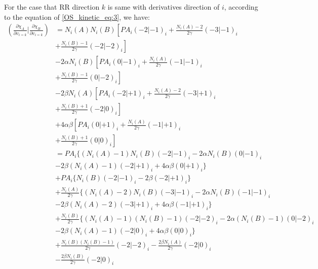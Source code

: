 For the case that RR direction $k$ is same with derivatives direction of $i$, according
to the equation of \ref{OS_kinetic_eq:3}, we have:
\begin{equation}
 \begin{split}
 \left(  \frac{\partial \chi_{A}}{\partial v_{i=k}}|
 \frac{\partial \chi_{B}}{\partial v_{i=k}} \right)  &=  N_{i}(A)N_{i}(B)
\left[ PA_{i}(-2|-1)_{i} + \frac{N_{i}(A)-2}{2 \gamma}(-3|-1)_{i} \right. \\ 
 &+ \left. \frac{N_{i}(B)-1}{2 \gamma}(-2|-2)_{i} \right] \\
&- 2\alpha N_{i}(B)
\left[ PA_{i}(0|-1)_{i} + \frac{N_{i}(A)}{2 \gamma}(-1|-1)_{i} \right. \\ 
 &+ \left. \frac{N_{i}(B)-1}{2 \gamma}(0|-2)_{i} \right] \\ 
&- 2\beta  N_{i}(A)
\left[ PA_{i}(-2|+1)_{i} + \frac{N_{i}(A)-2}{2 \gamma}(-3|+1)_{i} \right. \\ 
 &+ \left. \frac{N_{i}(B)+1}{2 \gamma}(-2|0)_{i} \right] \\  
&+ 4\alpha\beta
\left[ PA_{i}(0|+1)_{i} + \frac{N_{i}(A)}{2 \gamma}(-1|+1)_{i} \right. \\ 
 &+ \left. \frac{N_{i}(B)+1}{2 \gamma}(0|0)_{i} \right] \\
&= PA_{i} \Bigg\{   
(N_{i}(A)-1)N_{i}(B)(-2|-1)_{i} - 2\alpha N_{i}(B)(0|-1)_{i}  \\
&- 2\beta(N_{i}(A)-1)(-2|+1)_{i} +4\alpha\beta (0|+1)_{i} \Bigg\}  \\
&+ PA_{i}\Bigg\{ N_{i}(B)(-2|-1)_{i} -2\beta(-2|+1)_{i} \Bigg\} \\
&+\frac{N_{i}(A)}{2 \gamma} \Bigg\{ 
(N_{i}(A)-2)N_{i}(B)(-3|-1)_{i} - 2\alpha N_{i}(B)(-1|-1)_{i}  \\
&-2\beta(N_{i}(A)-2)(-3|+1)_{i} + 4\alpha\beta(-1|+1)_{i} \Bigg \} \\
&+\frac{N_{i}(B)}{2 \gamma} \Bigg\{ 
(N_{i}(A)-1)(N_{i}(B)-1)(-2|-2)_{i} - 2\alpha (N_{i}(B)-1)(0|-2)_{i} \\ 
&- 2\beta(N_{i}(A)-1)(-2|0)_{i} + 4\alpha\beta(0|0)_{i} \Bigg\} \\
&+\frac{N_{i}(B)(N_{i}(B)-1)}{2 \gamma}(-2|-2)_{i} - 
\frac{2\beta N_{i}(A)}{2 \gamma} (-2|0)_{i} \\
&-\frac{2\beta N_{i}(B)}{2 \gamma} (-2|0)_{i}
\end{split}
 \label{OS_kinetic_eq:5}
\end{equation}

